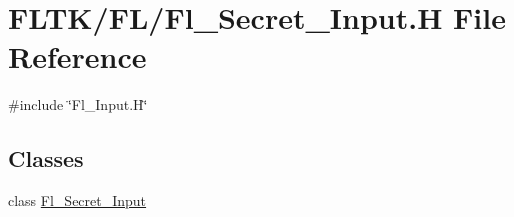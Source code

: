 \hypertarget{_fl___secret___input_8_h}{}\section{F\+L\+T\+K/\+F\+L/\+Fl\+\_\+\+Secret\+\_\+\+Input.H File Reference}
\label{_fl___secret___input_8_h}
{\ttfamily \#include \char`\"{}Fl\+\_\+\+Input.\+H\char`\"{}}\newline
\subsection*{Classes}
\begin{DoxyCompactItemize}
\item 
class \hyperlink{class_fl___secret___input}{Fl\+\_\+\+Secret\+\_\+\+Input}
\end{DoxyCompactItemize}

